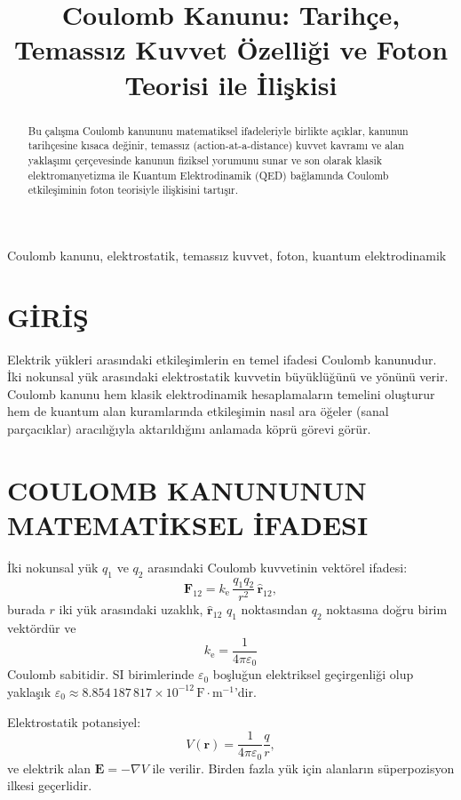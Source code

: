 \documentclass[conference,a4paper]{IEEEtran}
\title{Coulomb Kanunu: Tarihçe, Temassız Kuvvet Özelliği ve Foton Teorisi ile İlişkisi}
\author{\IEEEauthorblockN{Ferah Feza}
\IEEEauthorblockA{Independent Researcher\\
Email: \texttt{ferahfeza@example.com}}
}
\begin{document}
\maketitle

\begin{abstract}
Bu çalışma Coulomb kanununu matematiksel ifadeleriyle birlikte açıklar, kanunun tarihçesine kısaca değinir, temassız (action-at-a-distance) kuvvet kavramı ve alan yaklaşımı çerçevesinde kanunun fiziksel yorumunu sunar ve son olarak klasik elektromanyetizma ile Kuantum Elektrodinamik (QED) bağlamında Coulomb etkileşiminin foton teorisiyle ilişkisini tartışır.
\end{abstract}

\begin{IEEEkeywords}
Coulomb kanunu, elektrostatik, temassız kuvvet, foton, kuantum elektrodinamik
\end{IEEEkeywords}

\section{G\.{I}R\.{I}\c{S}}
Elektrik yükleri arasındaki etkileşimlerin en temel ifadesi Coulomb kanunudur. İki nokunsal yük arasındaki elektrostatik kuvvetin büyüklüğünü ve yönünü verir. Coulomb kanunu hem klasik elektrodinamik hesaplamaların temelini oluşturur hem de kuantum alan kuramlarında etkileşimin nasıl ara öğeler (sanal parçacıklar) aracılığıyla aktarıldığını anlamada köprü görevi görür.

\section{COULOMB KANUNUNUN MATEMAT\.{I}KSEL \.{I}FADESI}
İki nokunsal yük \(q_1\) ve \(q_2\) arasındaki Coulomb kuvvetinin vektörel ifadesi:
\begin{equation}
\mathbf{F}_{12} = k_\mathrm{e}\,\frac{q_1 q_2}{r^2}\,\hat{\mathbf{r}}_{12},
\end{equation}
burada \(r\) iki yük arasındaki uzaklık, \(\hat{\mathbf{r}}_{12}\) \(q_1\) noktasından \(q_2\) noktasına doğru birim vektördür ve
\begin{equation}
k_\mathrm{e}=\frac{1}{4\pi\varepsilon_0}
\end{equation}
Coulomb sabitidir. SI birimlerinde \(\varepsilon_0\) boşluğun elektriksel geçirgenliği olup yaklaşık \(\varepsilon_0 \approx 8.854\,187\,817\times10^{-12}\,\mathrm{F\cdot m^{-1}}\)'dir.

Elektrostatik potansiyel:
\begin{equation}
V(\mathbf r) = \frac{1}{4\pi\varepsilon_0}\frac{q}{r},
\end{equation}
ve elektrik alan \(\mathbf{E}=-\nabla V\) ile verilir. Birden fazla yük için alanların süperpozisyon ilkesi geçerlidir.
\end{document}
